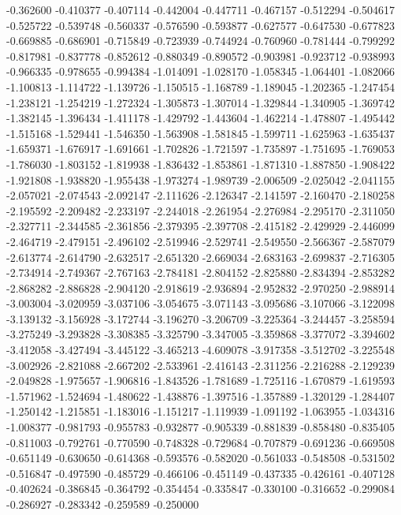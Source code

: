 -0.362600
-0.410377
-0.407114
-0.442004
-0.447711
-0.467157
-0.512294
-0.504617
-0.525722
-0.539748
-0.560337
-0.576590
-0.593877
-0.627577
-0.647530
-0.677823
-0.669885
-0.686901
-0.715849
-0.723939
-0.744924
-0.760960
-0.781444
-0.799292
-0.817981
-0.837778
-0.852612
-0.880349
-0.890572
-0.903981
-0.923712
-0.938993
-0.966335
-0.978655
-0.994384
-1.014091
-1.028170
-1.058345
-1.064401
-1.082066
-1.100813
-1.114722
-1.139726
-1.150515
-1.168789
-1.189045
-1.202365
-1.247454
-1.238121
-1.254219
-1.272324
-1.305873
-1.307014
-1.329844
-1.340905
-1.369742
-1.382145
-1.396434
-1.411178
-1.429792
-1.443604
-1.462214
-1.478807
-1.495442
-1.515168
-1.529441
-1.546350
-1.563908
-1.581845
-1.599711
-1.625963
-1.635437
-1.659371
-1.676917
-1.691661
-1.702826
-1.721597
-1.735897
-1.751695
-1.769053
-1.786030
-1.803152
-1.819938
-1.836432
-1.853861
-1.871310
-1.887850
-1.908422
-1.921808
-1.938820
-1.955438
-1.973274
-1.989739
-2.006509
-2.025042
-2.041155
-2.057021
-2.074543
-2.092147
-2.111626
-2.126347
-2.141597
-2.160470
-2.180258
-2.195592
-2.209482
-2.233197
-2.244018
-2.261954
-2.276984
-2.295170
-2.311050
-2.327711
-2.344585
-2.361856
-2.379395
-2.397708
-2.415182
-2.429929
-2.446099
-2.464719
-2.479151
-2.496102
-2.519946
-2.529741
-2.549550
-2.566367
-2.587079
-2.613774
-2.614790
-2.632517
-2.651320
-2.669034
-2.683163
-2.699837
-2.716305
-2.734914
-2.749367
-2.767163
-2.784181
-2.804152
-2.825880
-2.834394
-2.853282
-2.868282
-2.886828
-2.904120
-2.918619
-2.936894
-2.952832
-2.970250
-2.988914
-3.003004
-3.020959
-3.037106
-3.054675
-3.071143
-3.095686
-3.107066
-3.122098
-3.139132
-3.156928
-3.172744
-3.196270
-3.206709
-3.225364
-3.244457
-3.258594
-3.275249
-3.293828
-3.308385
-3.325790
-3.347005
-3.359868
-3.377072
-3.394602
-3.412058
-3.427494
-3.445122
-3.465213
-4.609078
-3.917358
-3.512702
-3.225548
-3.002926
-2.821088
-2.667202
-2.533961
-2.416143
-2.311256
-2.216288
-2.129239
-2.049828
-1.975657
-1.906816
-1.843526
-1.781689
-1.725116
-1.670879
-1.619593
-1.571962
-1.524694
-1.480622
-1.438876
-1.397516
-1.357889
-1.320129
-1.284407
-1.250142
-1.215851
-1.183016
-1.151217
-1.119939
-1.091192
-1.063955
-1.034316
-1.008377
-0.981793
-0.955783
-0.932877
-0.905339
-0.881839
-0.858480
-0.835405
-0.811003
-0.792761
-0.770590
-0.748328
-0.729684
-0.707879
-0.691236
-0.669508
-0.651149
-0.630650
-0.614368
-0.593576
-0.582020
-0.561033
-0.548508
-0.531502
-0.516847
-0.497590
-0.485729
-0.466106
-0.451149
-0.437335
-0.426161
-0.407128
-0.402624
-0.386845
-0.364792
-0.354454
-0.335847
-0.330100
-0.316652
-0.299084
-0.286927
-0.283342
-0.259589
-0.250000
